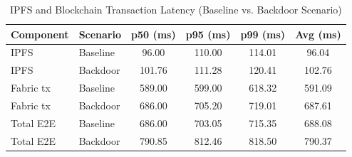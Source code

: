 \begin{table}[!t]
\renewcommand{\arraystretch}{1.2}
\caption{IPFS and Blockchain Transaction Latency (Baseline vs. Backdoor Scenario)}
\label{tab:infra}
\centering
\begin{tabular}{llcccc}
\hline
\textbf{Component} & \textbf{Scenario} & \textbf{p50 (ms)} & \textbf{p95 (ms)} & \textbf{p99 (ms)} & \textbf{Avg (ms)} \\
\hline
IPFS       & Baseline  &  96.00 & 110.00 & 114.01 &  96.04 \\
IPFS       & Backdoor  & 101.76 & 111.28 & 120.41 & 102.76 \\
\hline
Fabric tx  & Baseline  & 589.00 & 599.00 & 618.32 & 591.09 \\
Fabric tx  & Backdoor  & 686.00 & 705.20 & 719.01 & 687.61 \\
\hline
Total E2E  & Baseline  & 686.00 & 703.05 & 715.35 & 688.08 \\
Total E2E  & Backdoor  & 790.85 & 812.46 & 818.50 & 790.37 \\
\hline
\end{tabular}
\end{table}

